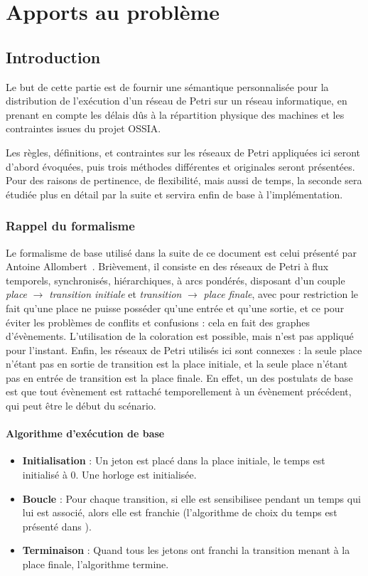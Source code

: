\chapter{Apports au problème}
\label{chapterApports}
\section{Introduction}
Le but de cette partie est de fournir une sémantique  personnalisée pour la distribution de l'exécution d'un réseau de Petri sur un réseau informatique, en prenant en compte les délais dûs à la répartition physique des machines et les contraintes issues du projet \ac{OSSIA}.

Les règles, définitions, et contraintes sur les réseaux de Petri appliquées ici seront d'abord évoquées, puis trois méthodes différentes et originales seront présentées. Pour des raisons de pertinence, de flexibilité, mais aussi de temps, la seconde sera étudiée plus en détail par la suite et servira enfin de base à l'implémentation.  

\subsection{Rappel du formalisme}
Le formalisme de base utilisé dans la suite de ce document est celui présenté par Antoine Allombert~\cite[p. 146]{allombert2009aspects}. Brièvement, il consiste en des réseaux de Petri à flux temporels, synchronisés, hiérarchiques, à arcs pondérés, disposant d'un couple \textit{place} $\rightarrow$ \textit{transition initiale} et \textit{transition} $\rightarrow$ \textit{place finale}, avec pour restriction le fait qu'une place ne puisse posséder qu'une entrée et qu'une sortie, et ce pour éviter les problèmes de conflits et confusions : cela en fait des graphes d'évènements\cite[p. 7--9]{david2010discrete}. L'utilisation de la coloration est possible, mais n'est pas appliqué pour l'instant. Enfin, les réseaux de Petri utilisés ici sont connexes : la seule place n'étant pas en sortie de transition est la place initiale, et la seule place n'étant pas en entrée de transition est la place finale. En effet, un des postulats de base est que tout évènement est rattaché temporellement à un évènement précédent, qui peut être le début du scénario.

\subsubsection{Algorithme d'exécution de base}
\begin{itemize}
\item \textbf{Initialisation} : Un jeton est placé dans la place initiale, le temps est initialisé à 0. Une horloge est initialisée.
\item \textbf{Boucle} : Pour chaque transition, si elle est \gls{sensibilisee} pendant un temps qui lui est associé, alors elle est \gls{franchie} (l'algorithme de choix du temps est présenté dans \cite[p. 148]{allombert2009aspects}).
\item \textbf{Terminaison} : Quand tous les jetons ont franchi la transition menant à la place finale, l'algorithme termine.
\end{itemize}
